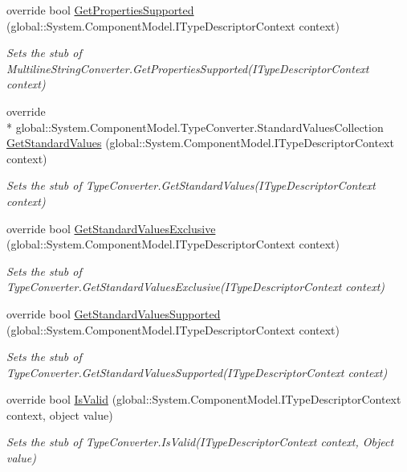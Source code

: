 \begin{DoxyCompactItemize}
override bool \hyperlink{class_system_1_1_component_model_1_1_fakes_1_1_stub_multiline_string_converter_a0a2ecb873aa5c367f4ba27c8ad2519f8}{Get\-Properties\-Supported} (global\-::\-System.\-Component\-Model.\-I\-Type\-Descriptor\-Context context)
\begin{DoxyCompactList}\small\item\em Sets the stub of Multiline\-String\-Converter.\-Get\-Properties\-Supported(\-I\-Type\-Descriptor\-Context context)\end{DoxyCompactList}\item 
override \\*
global\-::\-System.\-Component\-Model.\-Type\-Converter.\-Standard\-Values\-Collection \hyperlink{class_system_1_1_component_model_1_1_fakes_1_1_stub_multiline_string_converter_a204946b2a13db874a438a4d91c715071}{Get\-Standard\-Values} (global\-::\-System.\-Component\-Model.\-I\-Type\-Descriptor\-Context context)
\begin{DoxyCompactList}\small\item\em Sets the stub of Type\-Converter.\-Get\-Standard\-Values(\-I\-Type\-Descriptor\-Context context)\end{DoxyCompactList}\item 
override bool \hyperlink{class_system_1_1_component_model_1_1_fakes_1_1_stub_multiline_string_converter_a814386c5061078deca992c042fcd0d49}{Get\-Standard\-Values\-Exclusive} (global\-::\-System.\-Component\-Model.\-I\-Type\-Descriptor\-Context context)
\begin{DoxyCompactList}\small\item\em Sets the stub of Type\-Converter.\-Get\-Standard\-Values\-Exclusive(\-I\-Type\-Descriptor\-Context context)\end{DoxyCompactList}\item 
override bool \hyperlink{class_system_1_1_component_model_1_1_fakes_1_1_stub_multiline_string_converter_a00bc21c917ff4e5f8413271879bd8b51}{Get\-Standard\-Values\-Supported} (global\-::\-System.\-Component\-Model.\-I\-Type\-Descriptor\-Context context)
\begin{DoxyCompactList}\small\item\em Sets the stub of Type\-Converter.\-Get\-Standard\-Values\-Supported(\-I\-Type\-Descriptor\-Context context)\end{DoxyCompactList}\item 
override bool \hyperlink{class_system_1_1_component_model_1_1_fakes_1_1_stub_multiline_string_converter_a68cbd083331e586300e80c068a4b6226}{Is\-Valid} (global\-::\-System.\-Component\-Model.\-I\-Type\-Descriptor\-Context context, object value)
\begin{DoxyCompactList}\small\item\em Sets the stub of Type\-Converter.\-Is\-Valid(\-I\-Type\-Descriptor\-Context context, Object value)\end{DoxyCompactList}\end{DoxyCompactItemize}

